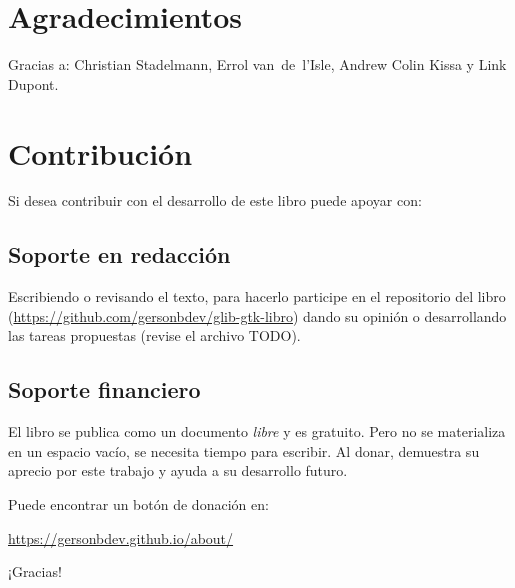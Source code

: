 \section{Agradecimientos}
    Gracias a: Christian Stadelmann, Errol van~de~l'Isle, Andrew Colin Kissa y Link Dupont.

\newpage


\section{Contribución}

    Si desea contribuir con el desarrollo de este libro puede apoyar con:
    
    \subsection{Soporte en redacción}
    Escribiendo o revisando el texto, para hacerlo participe en el repositorio del libro (\url{https://github.com/gersonbdev/glib-gtk-libro}) dando su opinión o desarrollando las tareas propuestas (revise el archivo TODO).
    
    \subsection{Soporte financiero}
    El libro se publica como un documento \emph{libre} y es gratuito. Pero no se materializa en un espacio vacío, se necesita tiempo para escribir. Al donar, demuestra su aprecio por este trabajo y ayuda a su desarrollo futuro.
    
    Puede encontrar un botón de donación en:
    
    \url{https://gersonbdev.github.io/about/}
    
    ¡Gracias!
    